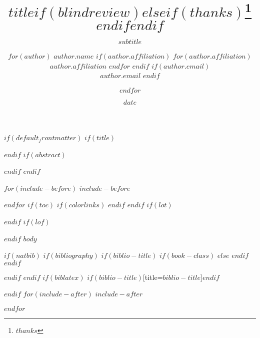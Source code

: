 \documentclass[$if(numbers)$numbers=$numbers$,$endif$$if(fontsize)$$fontsize$,$endif$$if(lang)$$babel-lang$,$endif$$if(papersize)$$papersize$paper,$endif$$for(classoption)$$classoption$$sep$,$endfor$]{$documentclass$}
\title{$title$$if(blindreview)$$else$$if(thanks)$\thanks{$thanks$}$endif$$endif$}
\subtitle{$subtitle$}
\author{
    $for(author)$
      \textbf{$author.name$}
      $if(author.affiliation)$
      $for(author.affiliation)$
      \\ \normalsize\textit{$author.affiliation$}\vspace{-3ex}
      $endfor$
      $endif$
      $if(author.email)$
      \\ \normalsize\texttt{$author.email$}
      $endif$
    \and 
    $endfor$
  }
\date{$date$}
\begin{document}
$if(default_frontmatter)$
$if(title)$
\maketitle
$endif$
$if(abstract)$
$endif$
$endif$

\newpage

$for(include-before)$
$include-before$

$endfor$
$if(toc)$
{
$if(colorlinks)$
\hypersetup{linkcolor=$if(toccolor)$$toccolor$$else$black$endif$}
$endif$
\setcounter{tocdepth}{$toc-depth$}
\tableofcontents
}
$endif$
$if(lot)$
\listoftables
$endif$
$if(lof)$
\listoffigures
$endif$
$body$

$if(natbib)$
$if(bibliography)$
$if(biblio-title)$
$if(book-class)$
\renewcommand\bibname{$biblio-title$}
$else$
\renewcommand\refname{$biblio-title$}
$endif$
$endif$


$endif$
$endif$
$if(biblatex)$
\printbibliography$if(biblio-title)$[title=$biblio-title$]$endif$

$endif$
$for(include-after)$
$include-after$

$endfor$
\end{document}
